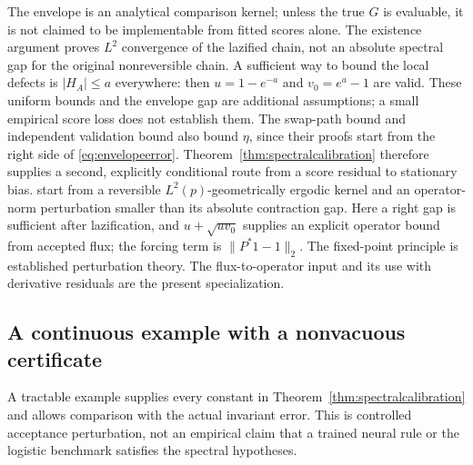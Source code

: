 \documentclass[pdflatex,iicol,sn-mathphys-ay]{sn-jnl}
\theoremstyle{definition}\newtheorem{definition}[theorem]{Definition}
\theoremstyle{remark}\newtheorem{remark}[theorem]{Remark}
\numberwithin{equation}{section}
\newcommand{\1}{\mathbf 1}
\begin{document}
The envelope is an analytical comparison kernel; unless the true $G$ is evaluable, it is not claimed to be implementable from fitted scores alone. The existence argument proves $L^2$ convergence of the lazified chain, not an absolute spectral gap for the original nonreversible chain. A sufficient way to bound the local defects is $|H_A|\le a$ everywhere: then $u=1-e^{-a}$ and $v_0=e^a-1$ are valid. These uniform bounds and the envelope gap are additional assumptions; a small empirical score loss does not establish them. The swap-path bound and independent validation bound also bound $\eta$, since their proofs start from the right side of \eqref{eq:envelopeerror}. Theorem~\ref{thm:spectralcalibration} therefore supplies a second, explicitly conditional route from a score residual to stationary bias. \citet[Theorem~3.4]{negrea} start from a reversible $L^2(p)$-geometrically ergodic kernel and an operator-norm perturbation smaller than its absolute contraction gap. Here a right gap is sufficient after lazification, and $u+\sqrt{uv_0}$ supplies an explicit operator bound from accepted flux; the forcing term is $\|P^*1-1\|_2$. The fixed-point principle is established perturbation theory. The flux-to-operator input and its use with derivative residuals are the present specialization.

\subsection{A continuous example with a nonvacuous certificate}\label{sec:controlledcertificate}
A tractable example supplies every constant in Theorem~\ref{thm:spectralcalibration} and allows comparison with the actual invariant error. This is controlled acceptance perturbation, not an empirical claim that a trained neural rule or the logistic benchmark satisfies the spectral hypotheses.
\end{document}
